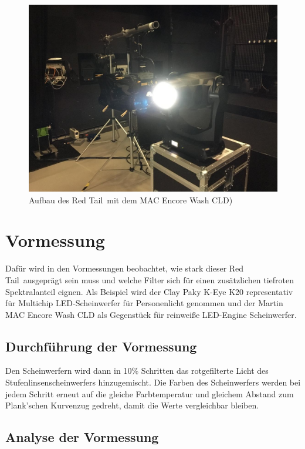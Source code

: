 \begin{figure}[H]     %
\centering
\includegraphics[width=1.0\textwidth]{bilder/messbild1} 
\caption {Aufbau des \glqq Red Tail\grqq\ mit dem MAC Encore Wash CLD)}\label{b_messbild1}
\end{figure}


\section{Vormessung}
Dafür wird in den Vormessungen beobachtet, wie stark dieser \glqq Red Tail\grqq\ ausgeprägt sein muss und welche Filter sich für einen zusätzlichen tiefroten Spektralanteil eignen.   
Als Beispiel wird der Clay Paky K-Eye K20 representativ für Multichip LED-Scheinwerfer für Personenlicht genommen und der Martin MAC Encore Wash CLD als Gegenstück für reinweiße LED-Engine Scheinwerfer. 

\subsection{Durchführung der Vormessung}

Den Scheinwerfern wird dann in 10\% Schritten das rotgefilterte Licht des Stufenlinsenscheinwerfers hinzugemischt. Die Farben des Scheinwerfers werden bei jedem Schritt erneut auf die gleiche Farbtemperatur und gleichem Abstand zum Plank'schen Kurvenzug gedreht, damit die Werte vergleichbar bleiben.

\subsection{Analyse der Vormessung}

